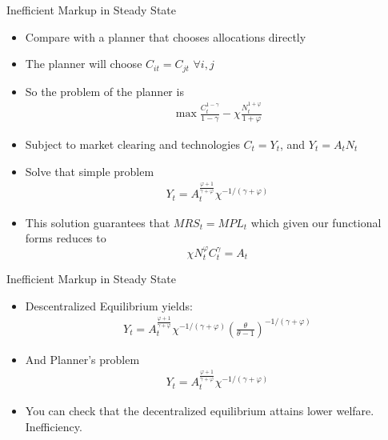 \documentclass[11pt,aspectratio=169,xcolor={dvipsnames},hyperref={pdftex,pdfpagemode=UseNone,hidelinks,pdfdisplaydoctitle=true},usepdftitle=false]{beamer}
\begin{document}
\begin{frame}{Inefficient Markup in Steady State}
\begin{itemize}
\item Compare with a planner that chooses allocations directly
\item The planner will choose $C_{it} = C_{jt}$ $\forall i,j$
\item So the problem of the planner is
\begin{align*}
\max \frac{C_t^{1-\gamma}}{1-\gamma} - \chi \frac{N_t^{1+\varphi}}{1+\varphi}
\end{align*}
\item Subject to market clearing and technologies $C_t = Y_t$, and $Y_t = A_t N_t$
\item Solve that simple problem
\begin{align*}
Y_t = A^{\frac{\varphi+1}{\gamma + \varphi}}_t \chi^{-1/(\gamma + \varphi)}
\end{align*}
\item This solution guarantees that $MRS_t = MPL_t$ which given our functional forms reduces to
$$\chi N_t^{\varphi} C_t^{\gamma} = A_t$$
\end{itemize}
\end{frame}

\begin{frame}{Inefficient Markup in Steady State}
\begin{itemize}
\item Descentralized Equilibrium yields:
\begin{align*}
Y_t = A^{\frac{\varphi+1}{\gamma + \varphi}}_t \chi^{-1/(\gamma + \varphi)} \left(\frac{\theta}{\theta-1}\right)^{-1/(\gamma + \varphi)}
\end{align*}
\item And Planner's problem
\begin{align*}
Y_t = A^{\frac{\varphi+1}{\gamma + \varphi}}_t \chi^{-1/(\gamma + \varphi)}
\end{align*}
\item You can check that the decentralized equilibrium attains lower welfare. Inefficiency.
\end{itemize}
\end{frame}
\end{document}

